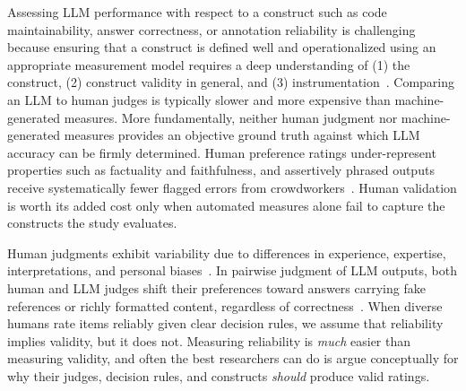 
Assessing LLM performance with respect to a construct such as code maintainability, answer correctness, or annotation reliability is challenging because ensuring that a construct is defined well and operationalized using an appropriate measurement model requires a deep understanding of (1) the construct, (2) construct validity in general, and (3) instrumentation~\cite{DBLP:journals/tse/SjobergB23,DBLP:books/sp/24/RalphKAA24}. Comparing an LLM to human judges is typically slower and more expensive than machine-generated measures. More fundamentally, neither human judgment nor machine-generated measures provides an objective ground truth against which LLM accuracy can be firmly determined. Human preference ratings under-represent properties such as factuality and faithfulness, and assertively phrased outputs receive systematically fewer flagged errors from crowdworkers~\cite{DBLP:conf/iclr/HoskingBB24}. Human validation is worth its added cost only when automated measures alone fail to capture the constructs the study evaluates.

Human judgments exhibit variability due to differences in experience, expertise, interpretations, and personal biases~\cite{DBLP:journals/pacmhci/McDonaldSF19}. In pairwise judgment of LLM outputs, both human and LLM judges shift their preferences toward answers carrying fake references or richly formatted content, regardless of correctness~\cite{DBLP:conf/emnlp/ChenCLJW24}. When diverse humans rate items reliably given clear decision rules, we assume that reliability implies validity, but it does not. Measuring reliability is \textit{much} easier than measuring validity, and often the best researchers can do is argue conceptually for why their judges, decision rules, and constructs \textit{should} produce valid ratings.

